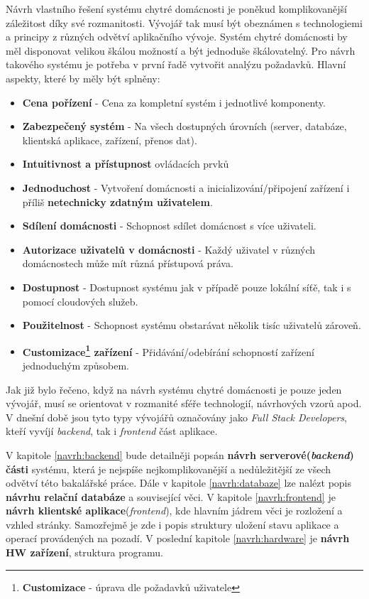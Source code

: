 Návrh vlastního řešení systému chytré domácnosti je poněkud komplikovanější záležitost díky své rozmanitosti.
Vývojář tak musí být obeznámen s technologiemi a principy z různých odvětví aplikačního vývoje.
Systém chytré domácnosti by měl disponovat velikou škálou možností a být jednoduše škálovatelný.
Pro návrh takového systému je potřeba v první řadě vytvořit analýzu požadavků.
\newline
\newline
Hlavní aspekty, které by měly být splněny:
\begin{itemize}
  \item \textbf{Cena pořízení} - Cena za kompletní systém i jednotlivé komponenty.
  \item \textbf{Zabezpečený systém} - Na všech dostupných úrovních (server, databáze, klientská aplikace, zařízení, přenos dat).
  \item \textbf{Intuitivnost a přístupnost} ovládacích prvků
  \item \textbf{Jednoduchost} - Vytvoření domácnosti a inicializování/připojení zařízení i příliš \textbf{netechnicky zdatným uživatelem}.
  \item \textbf{Sdílení domácnosti} - Schopnost sdílet domácnost s více uživateli.
  \item \textbf{Autorizace uživatelů v domácnosti} - Každý uživatel v různých domácnostech může mít různá přístupová práva.
  \item \textbf{Dostupnost} - Dostupnost systému jak v případě pouze lokální síťě, tak i s pomocí cloudových služeb.
  \item \textbf{Použitelnost} - Schopnost systému obstarávat několik tisíc uživatelů zároveň.
  \item \textbf{Customizace\footnote{\textbf{Customizace} - úprava dle požadavků uživatele} zařízení} - Přidávání/odebírání schopností zařízení jednoduchým způsobem.
\end{itemize}
Jak již bylo řečeno, když na návrh systému chytré domácnosti je pouze jeden vývojář, musí se orientovat v rozmanité sféře technologií, návrhových vzorů apod.
V dnešní době jsou tyto typy vývojářů označovány jako \emph{Full Stack Developers}, kteří vyvíjí \emph{backend}, tak i \emph{frontend} část aplikace.

V kapitole \ref{navrh:backend} bude detailněji popsán \textbf{návrh serverové(\emph{backend}) části} systému, která je nejspíše nejkomplikovanější a nedůležitější ze všech odvětví této bakalářské práce.
Dále v kapitole \ref{navrh:databaze} lze nalézt popis \textbf{návrhu relační databáze} a související věci.
V kapitole \ref{navrh:frontend} je \textbf{návrh klientské aplikace}(\emph{frontend}), kde hlavním jádrem věci je rozložení a vzhled stránky.
Samozřejmě je zde i popis struktury uložení stavu aplikace a operací provádených na pozadí.
V poslední kapitole \ref{navrh:hardware} je \textbf{návrh HW zařízení}, struktura programu.
\newpage

